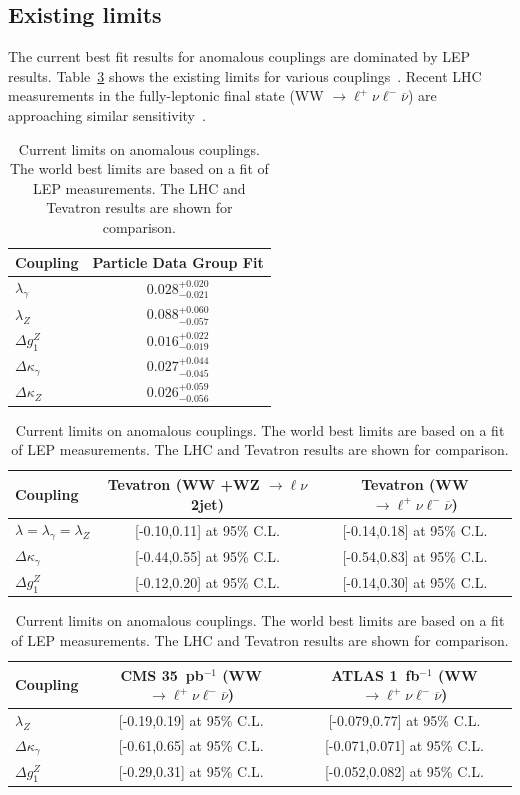 \subsection{Existing limits}
The current best fit results for anomalous couplings are dominated by LEP results. 
Table~\ref{tab:aTGC_limits_fromPDG} shows the
existing limits for various couplings~\cite{PhysRevD.80.053012,pdg}.
Recent LHC measurements in the fully-leptonic final state 
(WW $\to\ell^+\nu\ell^-\overline{\nu}$) are approaching similar 
sensitivity~\cite{Chatrchyan:2011tz,Aad:2012ks}.
\begin{table}[h]
\caption{\label{tab:aTGC_limits_fromPDG}
Current limits on anomalous couplings. The world best limits are based on a fit of LEP
measurements. The LHC and Tevatron results are shown for comparison.}
\begin{center}
  \begin{tabular}{l c}
    \hline  \hline
   Coupling  &  Particle Data Group Fit\\\hline
   $\lambda_\gamma$  &  $0.028^{+0.020}_{- 0.021}$ \\
   $\lambda_Z$  &  $0.088^{+0.060}_{- 0.057}$ \\
   $\Delta{g_1^Z}$  &  $0.016^{+0.022}_{- 0.019}$ \\
   $\Delta{\kappa_\gamma}$  &  $0.027^{+0.044}_{- 0.045}$ \\
   $\Delta{\kappa_Z}$  &  $0.026^{+0.059}_{- 0.056}$ \\
    \hline  
\end{tabular}
\vskip 2mm
  \begin{tabular}{l c c}
   \hline  
Coupling & Tevatron (WW +WZ $\to\ell\nu$2jet) & Tevatron (WW $\to\ell^+\nu\ell^-\overline{\nu}$)\\\hline
$\lambda = \lambda_\gamma = \lambda_Z$ & [-0.10,0.11] at 95\% C.L. & [-0.14,0.18] at 95\% C.L. \\
$\Delta{\kappa_\gamma}$  & [-0.44,0.55] at 95\% C.L. & [-0.54,0.83] at 95\% C.L. \\ 
$\Delta{g_1^Z}$  &   [-0.12,0.20] at 95\% C.L. & [-0.14,0.30] at 95\% C.L.\\
   \hline 
\end{tabular}
\vskip 2mm
  \begin{tabular}{l c c}
   \hline  
Coupling & CMS 35~pb${}^{-1}$ (WW $\to\ell^+\nu\ell^-\overline{\nu}$) & ATLAS 1~fb${}^{-1}$ (WW $\to\ell^+\nu\ell^-\overline{\nu}$)\\\hline
$\lambda_Z$ & [-0.19,0.19] at 95\% C.L. & [-0.079,0.77] at 95\% C.L. \\
$\Delta{\kappa_\gamma}$  & [-0.61,0.65] at 95\% C.L. & [-0.071,0.071] at 95\% C.L. \\ 
$\Delta{g_1^Z}$  &   [-0.29,0.31] at 95\% C.L. & [-0.052,0.082] at 95\% C.L.\\
   \hline  \hline
\end{tabular}
\end{center}
\end{table}
